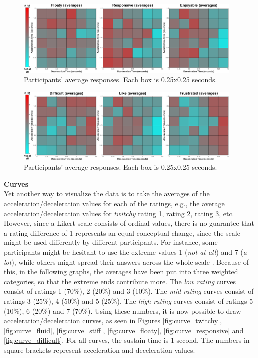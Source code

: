 \begin{figure}[htbp]
\centering
\includegraphics[width=0.97\textwidth]{Pics/Classes/averages/floaty_responsive_enjoyable_avg.png}
\caption{Participants' average responses. Each box is 0.25x0.25 seconds.}
\label{fig:floaty_responsive_enjoyable_avg}
\end{figure}

\begin{figure}[htbp]
\centering
\includegraphics[width=0.97\textwidth]{Pics/Classes/averages/difficult_like_frustration_avg}
\caption{Participants' average responses. Each box is 0.25x0.25 seconds.}
\label{fig:difficult_like_frustration_avg}
\end{figure}

\textbf{Curves}\\
Yet another way to visualize the data is to take the averages of the acceleration/deceleration values for each of the ratings, e.g., the average acceleration/deceleration values for \textit{twitchy} rating 1, rating 2, rating 3, etc. However, since a Likert scale consists of ordinal values, there is no guarantee that a rating difference of 1 represents an equal conceptual change, since the scale might be used differently by different participants. For instance, some participants might be hesitant to use the extreme values 1 (\textit{not at all}) and 7 (\textit{a lot}), while others might spread their answers across the whole scale \cite{cunningham}. Because of this, in the following graphs, the averages have been put into three weighted categories, so that the extreme ends contribute more. The \textit{low rating} curves consist of ratings 1 (70\%), 2 (20\%) and 3 (10\%). The \textit{mid rating} curves consist of ratings 3 (25\%), 4 (50\%) and 5 (25\%). The \textit{high rating} curves consist of ratings 5 (10\%), 6 (20\%) and 7 (70\%). Using these numbers, it is now possible to draw acceleration/deceleration curves, as seen in Figures \ref{fig:curve_twitchy}, \ref{fig:curve_fluid}, \ref{fig:curve_stiff}, \ref{fig:curve_floaty}, \ref{fig:curve_responsive} and \ref{fig:curve_difficult}. For all curves, the sustain time is 1 second. The numbers in square brackets represent acceleration and deceleration values.

